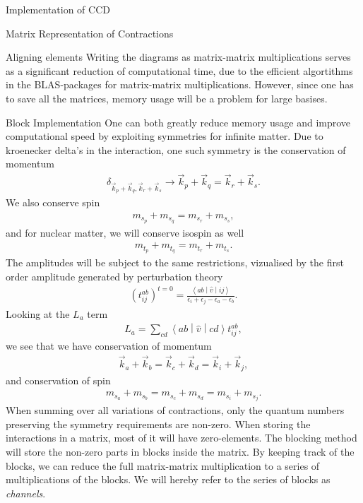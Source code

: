 \documentclass[twoside,english]{uiofysmaster}
\begin{document}
\begin{chapter}{Implementation of CCD}
\begin{section}{Matrix Representation of Contractions}
\begin{subsection}{Aligning elements}
			Writing the diagrams as matrix-matrix multiplications serves as a significant reduction of computational time, due to the efficient algortithms in the BLAS-packages for matrix-matrix multiplications. However, since one has to save all the matrices, memory usage will be a problem for large basises. 
		\end{subsection}

	\end{section}

	\begin{section}{Block Implementation}
		One can both greatly reduce memory usage and improve computational speed by exploiting symmetries for infinite matter. Due to kroenecker delta's in the interaction, one such symmetry is the conservation of momentum
		\begin{align}
			\delta_{\vec k_p + \vec k_q, \vec k_r + \vec k_s} \rightarrow \vec k_p + \vec k_q = \vec k_r + \vec k_s.
		\end{align}
		We also conserve spin 
		\begin{align}
			m_{s_p} + m_{s_q} = m_{s_r} + m_{s_s},
		\end{align}
		and for nuclear matter, we will conserve isospin as well
		\begin{align}
			m_{t_p} + m_{t_q} = m_{t_r} + m_{t_s}.
		\end{align}
		The amplitudes will be subject to the same restrictions, vizualised by the first order amplitude generated by perturbation theory
		\begin{align}
			(t_{ij}^{ab})^{t=0} = \frac{\left<ab\middle|\hat v\middle|ij\right>}{\epsilon_i + \epsilon_j - \epsilon_a - \epsilon_b}.
		\end{align}
		Looking at the $L_a$ term
		\begin{align}
			L_a = \sum_{cd} \left<ab\middle|\hat v\middle|cd\right> t_{ij}^{ab},
		\end{align}
		we see that we have conservation of momentum
		\begin{align}
			\vec k_a + \vec k_b = \vec k_c + \vec k_d = \vec k_i + \vec k_j,
		\end{align}
		and conservation of spin
		\begin{align}
			m_{s_a} + m_{s_b} = m_{s_c} + m_{s_d} = m_{s_i} + m_{s_j} .
		\end{align}
		When summing over all variations of contractions, only the quantum numbers preserving the symmetry requirements are non-zero. When storing the interactions in a matrix, most of it will have zero-elements. The blocking method will store the non-zero parts in blocks inside the matrix. By keeping track of the blocks, we can reduce the full matrix-matrix multiplication to a series of multiplications of the blocks. We will hereby refer to the series of blocks as \textit{channels}.


\end{section}
\end{chapter}
\end{document}
